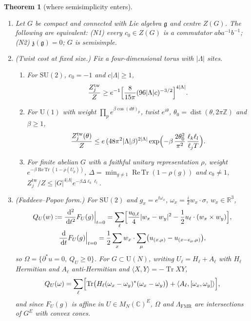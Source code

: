 \documentclass[11pt,a4paper]{amsart}
\newtheorem{theorem}{Theorem}[section]
\theoremstyle{definition}
\theoremstyle{remark}
\numberwithin{equation}{section}
\DeclareMathOperator{\Tr}{Tr}        %
\DeclareMathOperator{\ReTr}{Re\,Tr}  %
\newcommand{\R}{\mathbb{R}}          %
\newcommand{\C}{\mathbb{C}}          %
\newcommand{\Z}{\mathbb{Z}}          %
\newcommand{\ip}[2]{\langle #1,#2\rangle}  %
\newcommand{\abs}[1]{\lvert #1\rvert}      %
\newcommand{\dd}{\,\mathrm{d}}             %
\newcommand{\SU}{\mathrm{SU}}              %
\newcommand{\U}{\mathrm{U}}                %
\begin{document}
\begin{theorem}[where semisimplicity enters]\label{thm:semisimplicity}
\begin{enumerate}[label=\textup{(\alph*)},leftmargin=*]
\item Let $G$ be compact and connected with Lie algebra $\mathfrak g$ and centre $Z(G)$. The following are equivalent: \textup{(N1)} every $c_0\in Z(G)$ is a commutator $aba^{-1}b^{-1}$; \textup{(N2)} $\mathfrak z(\mathfrak g)=0$; $G$ is semisimple.
\item \textup{(Twist cost at fixed size.)} Fix a four-dimensional torus with $\abs\Lambda$ sites.
\begin{enumerate}[label=\textup{(\roman*)}]
\item For $\SU(2)$, $c_0=-1$ and $c\abs\Lambda\ge1$,
\[
\frac{Z^{\mathrm{tw}}_j}{Z}\ge e^{-1}\Bigl[\frac{8}{15\pi}(96\abs\Lambda c)^{-3/2}\Bigr]^{4\abs\Lambda}.
\]
\item For $\U(1)$ with weight $\prod_pe^{\beta\cos(d\theta)_p}$, twist $e^{i\theta}$, $\theta_0=\operatorname{dist}(\theta,2\pi\Z)$ and $\beta\ge1$,
\[
\frac{Z^{\mathrm{tw}}_j(\theta)}{Z}\le e\,(48\pi^2\abs\Lambda\beta)^{2\abs\Lambda}\exp\Bigl(-\beta\,\frac{2\theta_0^2}{\pi^2}\,\frac{\ell_k\ell_l}{\ell_jT}\Bigr).
\]
\item For finite abelian $G$ with a faithful unitary representation $\rho$, weight $e^{-\beta\ReTr(1-\rho(U_p))}$, $\Delta=\min_{g\ne1}\ReTr(1-\rho(g))$ and $c_0\ne1$, $Z^{\mathrm{tw}}_j/Z\le\abs G^{4\abs\Lambda}e^{-\beta\Delta\ell_k\ell_l}$.
\end{enumerate}
\item \textup{(Faddeev--Popov form.)} For $\SU(2)$ and $g_x=e^{t\omega_x}$, $\omega_x=\frac i2w_x\cdot\sigma$, $w_x\in\R^3$,
\[
\begin{gathered}
Q_U(w):=\frac{\dd^2}{\dd t^2}F_U(g)\Big|_{t=0}=\sum_\ell\Bigl[\frac{u_{0,\ell}}4\abs{w_x-w_y}^2-\frac12u_\ell\cdot(w_x\times w_y)\Bigr],\\
\frac{\dd}{\dd t}F_U(g)\Big|_{t=0}=\frac12\sum_xw_x\cdot\sum_\mu\bigl(u_{(x,\mu)}-u_{(x-e_\mu,\mu)}\bigr),
\end{gathered}
\]
so $\Omega=\{\partial^*u=0,\ Q_U\ge0\}$. For $G\subset\U(N)$, writing $U_\ell=H_\ell+A_\ell$ with $H_\ell$ Hermitian and $A_\ell$ anti-Hermitian and $\ip XY=-\Tr XY$,
\[
Q_U(\omega)=\sum_\ell\Bigl[\Tr\bigl(H_\ell(\omega_x-\omega_y)^*(\omega_x-\omega_y)\bigr)+\ip{A_\ell}{[\omega_x,\omega_y]}\Bigr],
\]
and since $F_U(g)$ is affine in $U\in M_N(\C)^E$, $\Omega$ and $\Lambda_{\mathrm{FMR}}$ are intersections of $G^E$ with convex cones.

\end{enumerate}
\end{theorem}
\end{document}
